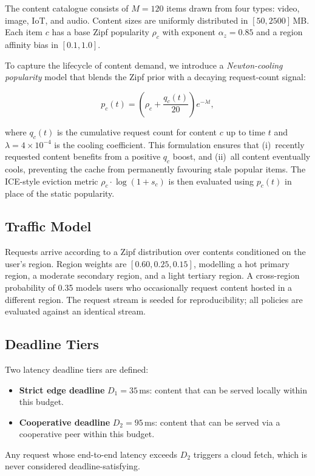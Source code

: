 \documentclass[conference]{IEEEtran}
\begin{document}
The content catalogue consists of $M = 120$ items drawn from four
types: video, image, IoT, and audio.  Content sizes are uniformly
distributed in $[50, 2500]$\,MB.  Each item $c$ has a base Zipf
popularity $\rho_c$ with exponent $\alpha_z = 0.85$ and a region
affinity bias in $[0.1, 1.0]$.

To capture the lifecycle of content demand, we introduce a
\emph{Newton-cooling popularity} model that blends the Zipf prior with
a decaying request-count signal:

\begin{equation}
  p_c(t) = \left(\rho_c + \frac{q_c(t)}{20}\right) e^{-\lambda t},
  \label{eq:newton}
\end{equation}

where $q_c(t)$ is the cumulative request count for content $c$ up to
time $t$ and $\lambda = 4 \times 10^{-4}$ is the cooling coefficient.
This formulation ensures that (i)~recently requested content benefits
from a positive $q_c$ boost, and (ii)~all content eventually cools,
preventing the cache from permanently favouring stale popular items.
The ICE-style eviction metric $\rho_c \cdot \log(1 + s_c)$ is then
evaluated using $p_c(t)$ in place of the static popularity.

\subsection{Traffic Model}

Requests arrive according to a Zipf distribution over contents
conditioned on the user's region.  Region weights are
$[0.60, 0.25, 0.15]$, modelling a hot primary region, a moderate
secondary region, and a light tertiary region.  A cross-region
probability of 0.35 models users who occasionally request content
hosted in a different region.  The request stream is seeded for
reproducibility; all policies are evaluated against an identical
stream.

\subsection{Deadline Tiers}

Two latency deadline tiers are defined:
\begin{itemize}
  \item \textbf{Strict edge deadline} $D_1 = 35$\,ms: content that
    can be served locally within this budget.
  \item \textbf{Cooperative deadline} $D_2 = 95$\,ms: content that
    can be served via a cooperative peer within this budget.
\end{itemize}
Any request whose end-to-end latency exceeds $D_2$ triggers a cloud
fetch, which is never considered deadline-satisfying.
\end{document}
